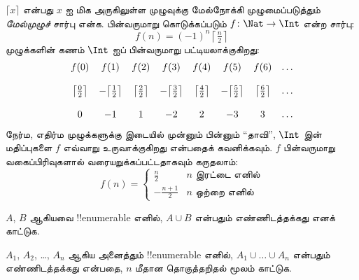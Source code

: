 \documentclass[../../../include/open-logic-section]{subfiles}
\begin{document}
\begin{ex}
$\lceil x \rceil$ என்பது $x$ ஐ மிக அருகிலுள்ள முழுவுக்கு
மேல்நோக்கி முழுமைப்படுத்தும் \emph{மேல்முழுச்} சார்பு என்க.
பின்வருமாறு கொடுக்கப்படும் $f \colon \Nat \to \Int$ என்ற சார்பு:
\[
  f(n) = (-1)^{n} \left\lceil\tfrac{n}{2}\right\rceil
\]
முழுக்களின் கணம் $\Int$ ஐப் பின்வருமாறு பட்டியலாக்குகிறது:
\[
\begin{array}{c c c c c c c c}
f(0) & f(1) & f(2) & f(3) & f(4) & f(5) & f(6) & \dots \\ \\
\big\lceil \tfrac{0}{2} \big\rceil & -\big\lceil \tfrac{1}{2}\big\rceil &  \big\lceil \tfrac{2}{2} \big\rceil & -\big\lceil \tfrac{3}{2} \big\rceil & \big\lceil \tfrac{4}{2} \big\rceil  & -\big\lceil \tfrac{5}{2}\big\rceil & \big\lceil \tfrac{6}{2} \big\rceil & \dots \\ \\
0 & -1 & 1 & -2 & 2 & -3 & 3& \dots
\end{array}
\]
நேர்ம, எதிர்ம முழுக்களுக்கு இடையில் முன்னும் பின்னும் ``தாவி'',
$\Int$ இன் மதிப்புகளை $f$ எவ்வாறு உருவாக்குகிறது என்பதைக் கவனிக்கவும்.
$f$ பின்வருமாறு வகைப்பிரிவுகளால் வரையறுக்கப்பட்டதாகவும் கருதலாம்:
\[
f(n) = \begin{cases}
  \frac{n}{2} & \text{$n$ இரட்டை எனில்}\\
  -\frac{n+1}{2} & \text{$n$ ஒற்றை எனில்}
  \end{cases}
\]
\end{ex}

\begin{prob}
$A$, $B$ ஆகியவை !!{enumerable} எனில்,
$A \cup B$ என்பதும் எண்ணிடத்தக்கது எனக் காட்டுக.
\end{prob}

\begin{prob}
$A_1$, $A_2$, \dots, $A_n$ ஆகிய அனைத்தும் !!{enumerable} எனில்,
$A_1 \cup \dots \cup A_n$ என்பதும் எண்ணிடத்தக்கது என்பதை,
$n$ மீதான தொகுத்தறிதல் மூலம் காட்டுக.
\end{prob}
\end{document}
